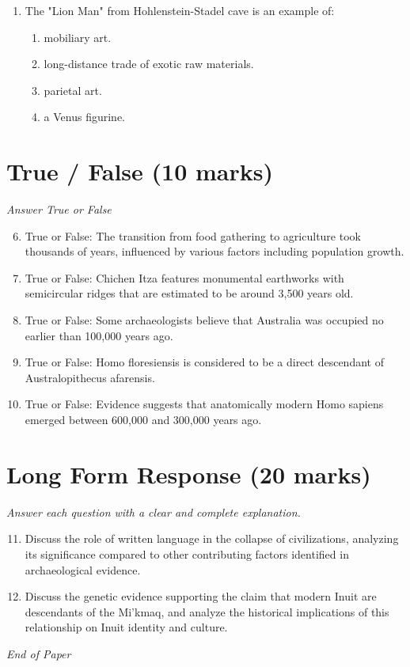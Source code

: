 \documentclass[12pt]{article}
\begin{document}
\begin{enumerate}[label=\arabic*.]
\begin{enumerate}[label=(\alph*)]
    \item pottery fragments.
    \item irrigation canals.
    \item jewelry artifacts.
    \item monumental works.
    \item pyramids.
\end{enumerate}
\item The "Lion Man" from Hohlenstein-Stadel cave is an example of:
\begin{enumerate}[label=(\alph*)]
    \item mobiliary art.
    \item long-distance trade of exotic raw materials.
    \item parietal art.
    \item a Venus figurine.
\end{enumerate}
\end{enumerate}

\section*{True / False (10 marks)}
\textit{Answer True or False}
\begin{enumerate}[label=\arabic*.]
\setcounter{enumi}{5}
\item True or False: The transition from food gathering to agriculture took thousands of years, influenced by various factors including population growth.
\item True or False: Chichen Itza features monumental earthworks with semicircular ridges that are estimated to be around 3,500 years old.
\item True or False: Some archaeologists believe that Australia was occupied no earlier than 100,000 years ago.
\item True or False: Homo floresiensis is considered to be a direct descendant of Australopithecus afarensis.
\item True or False: Evidence suggests that anatomically modern Homo sapiens emerged between 600,000 and 300,000 years ago.
\end{enumerate}

\section*{Long Form Response (20 marks)}
\textit{Answer each question with a clear and complete explanation.}
\begin{enumerate}[label=\arabic*.]
\setcounter{enumi}{10}
\item Discuss the role of written language in the collapse of civilizations, analyzing its
significance compared to other contributing factors identified in archaeological evidence.
\item Discuss the genetic evidence supporting the claim that modern Inuit are descendants of the
Mi'kmaq, and analyze the historical implications of this relationship on Inuit identity
and culture.
\end{enumerate}

\vfill
\noindent\textit{End of Paper}
\end{document}
